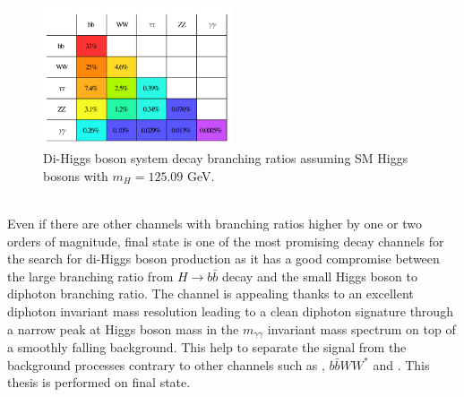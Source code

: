 \begin{figure}[htbp]
    \centering
    \includegraphics[width=0.5\textwidth]{Ch1/Img/HH_decays.png}
    \caption{Di-Higgs boson system decay branching ratios assuming SM Higgs bosons with $m_H=125.09$ GeV.}
    \label{fig:chap1:HH:HPD:DCY}
\end{figure}
\\
Even if there are other channels with branching ratios higher by one or two orders of magnitude, \bbyy final state is one of the most promising decay channels for the search for di-Higgs boson production as it has a good compromise between the large branching ratio from $H\to b\bar{b}$ decay and the small Higgs boson to diphoton branching ratio. The \bbyy channel is appealing thanks to an excellent diphoton invariant mass resolution leading to a clean diphoton signature through a narrow peak at Higgs boson mass in the $m_{\gamma\gamma}$ invariant mass spectrum on top of a smoothly falling background. This help to separate the signal from the background processes contrary to other channels such as \bbbb, $b\bar{b}WW^*$ and \bbtt. This thesis is performed on \bbyy final state.

